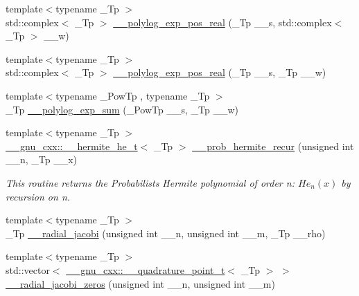 \begin{DoxyCompactItemize}
\item 
{\footnotesize template$<$typename \+\_\+\+Tp $>$ }\\std\+::complex$<$ \+\_\+\+Tp $>$ \hyperlink{namespacestd_1_1____detail_a36da38ab2aa8a67c089412937d5a695b}{\+\_\+\+\_\+polylog\+\_\+exp\+\_\+pos\+\_\+real} (\+\_\+\+Tp \+\_\+\+\_\+s, std\+::complex$<$ \+\_\+\+Tp $>$ \+\_\+\+\_\+w)
\item 
{\footnotesize template$<$typename \+\_\+\+Tp $>$ }\\std\+::complex$<$ \+\_\+\+Tp $>$ \hyperlink{namespacestd_1_1____detail_a8a6390a3855283fc27a5d57dd736b62e}{\+\_\+\+\_\+polylog\+\_\+exp\+\_\+pos\+\_\+real} (\+\_\+\+Tp \+\_\+\+\_\+s, \+\_\+\+Tp \+\_\+\+\_\+w)
\item 
{\footnotesize template$<$typename \+\_\+\+Pow\+Tp , typename \+\_\+\+Tp $>$ }\\\+\_\+\+Tp \hyperlink{namespacestd_1_1____detail_acbdb1ad0debb8c919b4dcb1589af734c}{\+\_\+\+\_\+polylog\+\_\+exp\+\_\+sum} (\+\_\+\+Pow\+Tp \+\_\+\+\_\+s, \+\_\+\+Tp \+\_\+\+\_\+w)
\item 
{\footnotesize template$<$typename \+\_\+\+Tp $>$ }\\\hyperlink{struct____gnu__cxx_1_1____hermite__he__t}{\+\_\+\+\_\+gnu\+\_\+cxx\+::\+\_\+\+\_\+hermite\+\_\+he\+\_\+t}$<$ \+\_\+\+Tp $>$ \hyperlink{namespacestd_1_1____detail_a15e668e86c18d01134aded2a1657b1b2}{\+\_\+\+\_\+prob\+\_\+hermite\+\_\+recur} (unsigned int \+\_\+\+\_\+n, \+\_\+\+Tp \+\_\+\+\_\+x)
\begin{DoxyCompactList}\small\item\em This routine returns the Probabilists Hermite polynomial of order n\+: $ He_n(x) $ by recursion on n. \end{DoxyCompactList}\item 
{\footnotesize template$<$typename \+\_\+\+Tp $>$ }\\\+\_\+\+Tp \hyperlink{namespacestd_1_1____detail_a6d85c9848b491999fc80a1cdbd23db66}{\+\_\+\+\_\+radial\+\_\+jacobi} (unsigned int \+\_\+\+\_\+n, unsigned int \+\_\+\+\_\+m, \+\_\+\+Tp \+\_\+\+\_\+rho)
\item 
{\footnotesize template$<$typename \+\_\+\+Tp $>$ }\\std\+::vector$<$ \hyperlink{struct____gnu__cxx_1_1____quadrature__point__t}{\+\_\+\+\_\+gnu\+\_\+cxx\+::\+\_\+\+\_\+quadrature\+\_\+point\+\_\+t}$<$ \+\_\+\+Tp $>$ $>$ \hyperlink{namespacestd_1_1____detail_a805abfff8b2898e15c507f679c0e15f3}{\+\_\+\+\_\+radial\+\_\+jacobi\+\_\+zeros} (unsigned int \+\_\+\+\_\+n, unsigned int \+\_\+\+\_\+m)

\end{DoxyCompactItemize}

